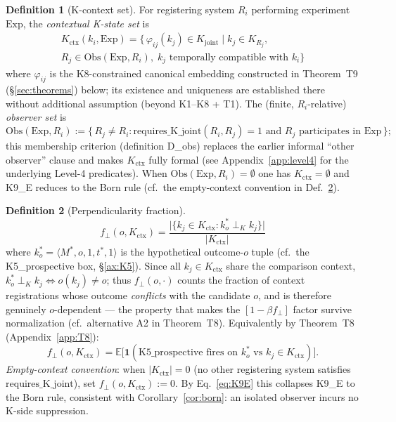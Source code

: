 \documentclass[12pt,a4paper]{article}
\theoremstyle{plain}
\theoremstyle{definition}
\newtheorem{definition}{Definition}[section]
\theoremstyle{remark}
\newcommand{\Kjoint}{K_{\mathrm{joint}}}
\newcommand{\Kctx}{K_{\mathrm{ctx}}}
\newcommand{\fperp}{f_{\!\perp}}
\newcommand{\phiij}{\varphi_{ij}}
\newcommand{\bk}[1]{\langle #1 \rangle}
\begin{document}
\begin{definition}[K-context set]\label{def:Kctx}
For registering system $R_i$ performing experiment $\mathrm{Exp}$,
the \emph{contextual K-state set} is
\begin{multline}
  \Kctx(k_i, \mathrm{Exp}) = \bigl\{\, \phiij(k_j) \in \Kjoint
  \;\big|\; k_j \in K_{R_j}, \\
  R_j \in \mathrm{Obs}(\mathrm{Exp}, R_i),\;
  k_j\text{ temporally compatible with }k_i \bigr\}
  \label{eq:Kctx}
\end{multline}
where $\phiij$ is the K8-constrained canonical embedding constructed in
Theorem~T9 (\S\ref{sec:theorems}) below; its existence and uniqueness
are established there without additional assumption (beyond K1--K8 + T1).
The (finite, $R_i$-relative) \emph{observer set} is
\[
  \mathrm{Obs}(\mathrm{Exp}, R_i) := \{\, R_j \neq R_i :
  \mathrm{requires\_K\_joint}(R_i, R_j) = 1
  \text{ and } R_j \text{ participates in } \mathrm{Exp} \,\};
\]
this membership criterion (definition D\_obs) replaces the earlier informal
``other observer'' clause and makes $\Kctx$ fully formal
(see Appendix~\ref{app:level4} for the underlying Level-4 predicates).
When $\mathrm{Obs}(\mathrm{Exp}, R_i) = \emptyset$ one has $\Kctx = \emptyset$
and K9\_E reduces to the Born rule (cf.\ the empty-context convention in
Def.~\ref{def:fperp}).
\end{definition}

\begin{definition}[Perpendicularity fraction]\label{def:fperp}
\begin{equation}
  \fperp(o, \Kctx)
  = \frac{\bigl|\{k_j \in \Kctx : k_o^* \perp_K k_j\}\bigr|}
         {|\Kctx|}
  \label{eq:fperp}
\end{equation}
where $k_o^* = \bk{M^*, o, 1, t^*, 1}$ is the hypothetical outcome-$o$ tuple
(cf.\ the K5\_prospective box, \S\ref{ax:K5}). Since all $k_j \in \Kctx$
share the comparison context, $k_o^* \perp_K k_j \iff o(k_j) \neq o$;
thus $\fperp(o,\cdot)$ counts the fraction of context registrations whose
outcome \emph{conflicts} with the candidate $o$, and is therefore genuinely
$o$-dependent --- the property that makes the $[1-\beta\fperp]$ factor
survive normalization (cf.\ alternative A2 in Theorem~T8).
Equivalently by Theorem~T8 (Appendix~\ref{app:T8}):
\[
  \fperp(o,\Kctx) = \mathbb{E}\bigl[\mathbf{1}(\text{K5\_prospective fires on }
  k_o^*\text{ vs }k_j \in \Kctx)\bigr].
\]
\emph{Empty-context convention}: when $|\Kctx| = 0$ (no other registering
system satisfies $\mathrm{requires\_K\_joint}$), set
$\fperp(o,\Kctx) := 0$. By Eq.~\eqref{eq:K9E} this collapses K9\_E to the
Born rule, consistent with Corollary~\ref{cor:born}: an isolated observer
incurs no K-side suppression.
\end{definition}
\end{document}
